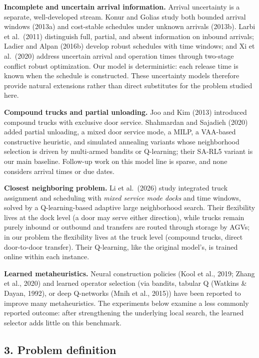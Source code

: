 \documentclass[
]{article}
\newcounter{none} %
\begin{document}
\textbf{Incomplete and uncertain arrival information.} Arrival
uncertainty is a separate, well-developed stream. Konur and Golias study
both bounded arrival windows (2013a) and cost-stable schedules under
unknown arrivals (2013b). Larbi et al.~(2011) distinguish full, partial,
and absent information on inbound arrivals; Ladier and Alpan (2016b)
develop robust schedules with time windows; and Xi et al.~(2020) address
uncertain arrival and operation times through two-stage conflict robust
optimization. Our model is deterministic: each release time is known
when the schedule is constructed. These uncertainty models therefore
provide natural extensions rather than direct substitutes for the
problem studied here.

\textbf{Compound trucks and partial unloading.} Joo and Kim (2013)
introduced compound trucks with exclusive door service. Shahmardan and
Sajadieh (2020) added partial unloading, a mixed door service mode, a
MILP, a VAA-based constructive heuristic, and simulated annealing
variants whose neighborhood selection is driven by multi-armed bandits
or Q-learning; their SA-RL5 variant is our main baseline. Follow-up work
on this model line is sparse, and none considers arrival times or due
dates.

\textbf{Closest neighboring problem.} Li et al.~(2026) study integrated
truck assignment and scheduling with \emph{mixed service mode docks} and
time windows, solved by a Q-learning-based adaptive large neighborhood
search. Their flexibility lives at the dock level (a door may serve
either direction), while trucks remain purely inbound or outbound and
transfers are routed through storage by AGVs; in our problem the
flexibility lives at the truck level (compound trucks, direct
door-to-door transfer). Their Q-learning, like the original model's, is
trained online within each instance.

\textbf{Learned metaheuristics.} Neural construction policies (Kool et
al., 2019; Zhang et al., 2020) and learned operator selection (via
bandits, tabular Q (Watkins \& Dayan, 1992), or deep Q-networks (Mnih et
al., 2015)) have been reported to improve many metaheuristics. The
experiments below examine a less commonly reported outcome: after
strengthening the underlying local search, the learned selector adds
little on this benchmark.

\subsection{3. Problem definition}\label{problem-definition}
\end{document}
